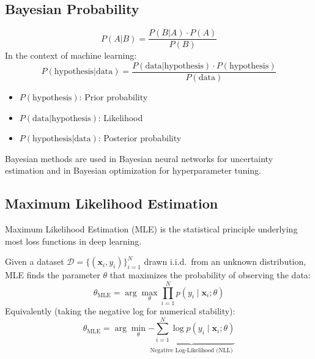 \subsection{Bayesian Probability}

\begin{definition}
\begin{equation}
P(A|B) = \frac{P(B|A) \cdot P(A)}{P(B)}
\end{equation}
In the context of machine learning:
\begin{equation}
P(\text{hypothesis}|\text{data}) = \frac{P(\text{data}|\text{hypothesis}) \cdot P(\text{hypothesis})}{P(\text{data})}
\end{equation}
\begin{itemize}
    \item $P(\text{hypothesis})$: Prior probability
    \item $P(\text{data}|\text{hypothesis})$: Likelihood
    \item $P(\text{hypothesis}|\text{data})$: Posterior probability
\end{itemize}
\end{definition}

Bayesian methods are used in Bayesian neural networks for uncertainty estimation and in Bayesian optimization for hyperparameter tuning.

\subsection{Maximum Likelihood Estimation}

Maximum Likelihood Estimation (MLE) is the statistical principle underlying most loss functions in deep learning.

\begin{definition}
Given a dataset $\mathcal{D} = \{(\mathbf{x}_i, y_i)\}_{i=1}^{N}$ drawn i.i.d.\ from an unknown distribution, MLE finds the parameter $\theta$ that maximizes the probability of observing the data:
\begin{equation}
\theta_{\text{MLE}} = \arg\max_{\theta} \prod_{i=1}^{N} p(y_i \mid \mathbf{x}_i; \theta)
\end{equation}
Equivalently (taking the negative log for numerical stability):
\begin{equation}
\theta_{\text{MLE}} = \arg\min_{\theta} \underbrace{-\sum_{i=1}^{N} \log p(y_i \mid \mathbf{x}_i; \theta)}_{\text{Negative Log-Likelihood (NLL)}}
\end{equation}
\end{definition}

